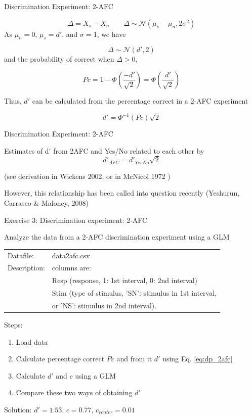 \documentclass[10pt]{beamer}
\begin{document}
\begin{frame}{Discrimination Experiment: 2-AFC}

$$
\Delta = X_s - X_n \quad \quad \Delta \sim \mathcal{N} (\mu_s - \mu_n, 2\sigma^2)
$$
As $\mu_n=0$, $\mu_s=d'$, and $\sigma=1$, we have

$$
\Delta \sim \mathcal{N} (d', 2)
$$
and the probability of correct  when $\Delta > 0$,

$$Pc = 1 -\Phi\left(\frac{-d'}{\sqrt{2}}\right) = \Phi\left(\frac{d'}{\sqrt{2}} \right)
$$

Thus, $d'$ can be calculated from the percentage correct in a 2-AFC experiment

\begin{equation}
\label{eq:dp_2afc}
d' = \Phi^{-1}(Pc) \sqrt{2}
\end{equation}

\end{frame}

\begin{frame}{Discrimination Experiment: 2-AFC}

Estimates of d' from 2AFC and Yes/No related to each other by 
$$
d'_{AFC} =  d'_{YesNo} \sqrt{2}
$$ 

(see derivation in Wickens 2002,  or in McNicol 1972 )\\
\vspace{10pt}

However, this relationship has been called into question recently (Yeshurun, Carrasco \& Maloney, 2008)
\end{frame}




\begin{frame}[fragile]{Exercise 3: Discrimination experiment: 2-AFC}

Analyze the data from a 2-AFC discrimination experiment using a GLM

\begin{tabular}{ll}
Datafile: & data2afc.csv\\
Description: & columns are: \\
& Resp (response, 1: 1st interval, 0: 2nd interval)\\
& Stim (type of stimulus, 'SN': stimulus in 1st interval, \\
& or 'NS': stimulus in 2nd interval).
\end{tabular}

\vspace{10pt}


Steps:
\begin{enumerate}
\item Load data
\item Calculate percentage correct $Pc$ and from it $d'$ using Eq. \autoref{eq:dp_2afc}
\item Calculate $d'$ and $c$ using a GLM
\item Compare these two ways of obtaining $d'$
\end{enumerate}

\pause
\begin{center}
Solution: $d' = 1.53$, $c=0.77$, $c_{center} = 0.01$
\end{center}
\end{frame}
\end{document}
